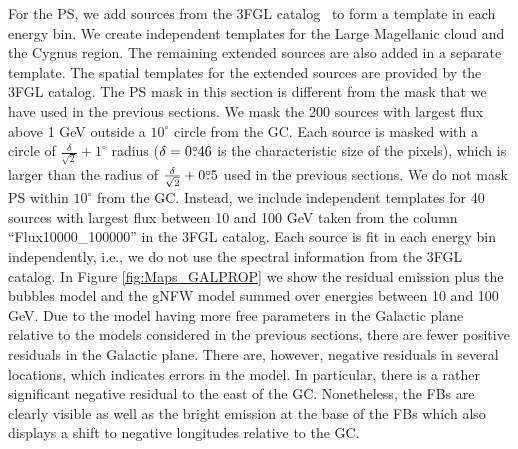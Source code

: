 For the PS, we add sources from the 3FGL catalog~\citep{2015ApJS..218...23A} to form a template
in each energy bin.
We create independent templates for the Large Magellanic cloud and the Cygnus region.
The remaining extended sources are also added in a separate template.
The spatial templates for the extended sources are provided by the 3FGL catalog.
The PS mask in this section is different from the mask that we have used in the previous sections.
We mask the 200 sources with largest flux above 1 GeV outside a $10^\circ$ circle from the GC.
Each source is masked with a circle of $\frac{\delta}{\sqrt{2}} + 1^\circ$ radius ($\delta = 0{\overset{\circ}{.}}46$ is the characteristic size of the pixels),
which is larger than the radius of  $\frac{\delta}{\sqrt{2}} + 0{\overset{\circ}{.}}5$ used in the previous sections.
We do not mask PS within $10^\circ$ from the GC.
Instead, we include independent templates for 40 sources with largest flux between 10 and 100 GeV
taken from the column ``Flux10000\_100000'' in the 3FGL catalog.
Each source is fit in each energy bin independently, i.e., we do not use the spectral information from the 3FGL catalog.
In Figure \ref{fig:Maps_GALPROP} we show the residual emission plus the \Fermi bubbles model and the gNFW model summed over energies between 10 and 100 GeV.
Due to the model having more free parameters in the Galactic plane relative to the models considered in the previous sections,
there are fewer positive residuals in the Galactic plane.
There are, however, negative residuals in several locations, which indicates errors in the model. 
In particular, there is a rather significant negative residual to the east of the GC.
Nonetheless, the FBs are clearly visible as well as the bright emission at the base of the FBs which also displays a shift to negative
longitudes relative to the GC.


